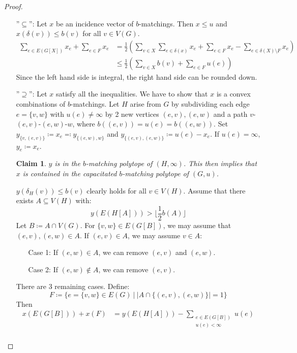 \documentclass[11pt, a4paper]{article}
\newcommand{\floor}[1]{\lfloor #1 \rfloor}
\newcommand{\abs}[1]{\left\lvert#1\right\rvert}
\newcommand{\set}[1]{\{#1\}}
\newtheorem*{claim}{Claim}
\theoremstyle{remark}
\theoremstyle{definition}
\begin{document}
\begin{proof}\
	\begin{enumerate}
		\item[''$\subseteq$'':]
		Let $x$ be an incidence vector of $b$-matchings. Then $x\leq u$ and
		$x(\delta(v))\leq b(v)$ for all $v\in V(G)$.
		\begin{align*}
			\sum_{e\in E(G[X])}x_e+\sum_{e\in F}x_e & =\frac{1}{2}\left(\sum_{v\in X}\sum_{e\in \delta(x)}x_e+\sum_{e\in F}x_e-\sum_{e\in\delta(X)\setminus F}x_e\right) \\
			                                        & \leq \frac{1}{2}\left(\sum_{v\in X}b(v)+\sum_{e\in F}u(e)\right)
		\end{align*}
		Since the left hand side is integral, the right hand side can be rounded down.

		\item[''$\supseteq$'':]
		Let $x$ satisfy all the inequalities. We have to show that $x$ is a convex
		combinations of $b$-matchings. Let $H$ arise from $G$ by subdividing
		each edge $e=\set{v,w}$ with $u(e)\neq\infty$ by 2 new vertices
		$(e,v), (e,w)$ and a path $v$-$(e,v)$-$(e,w)$-$w$, where
		$b((e,v))=u(e)=b((e,w))$. Set $y_{\set{v,(e,v)}}\coloneqq x_e\eqqcolon
			y_{\set{(e,w),w}}$ and $y_{\set{(e,v),(e,w)}}\coloneqq u(e)-x_e$. If
		$u(e)=\infty$, $y_e\coloneqq x_e$.
		\begin{claim}
			$y$ is in the $b$-matching polytope of $(H,\infty)$. This then implies
			that $x$ is contained in the capacitated $b$-matching polytope of $(G,u)$.
		\end{claim}
		$y(\delta_H(v))\leq b(v)$ clearly holds for all $v\in V(H)$. Assume
		that there exists $A\subseteq V(H)$ with:
		\[y(E(H[A]))>\floor{\frac{1}{2}b(A)}\]
		Let $B\coloneqq A\cap V(G)$. For $\set{v,w}\in E(G[B])$, we may
		assume that $(e,v),(e,w)\in A$. If $(e,v)\in A$, we may assume $v\in
			A$:
		\begin{enumerate}
			\item[Case 1:] If $(e,w)\in A$, we can remove $(e,v)$ and $(e,w)$.
			\item[Case 2:] If $(e,w)\notin A$, we can remove $(e,v)$.
		\end{enumerate}
		There are 3 remaining cases. Define:
		\[F\coloneqq \set{e=\set{v,w}\in E(G) \ |\ \abs{A\cap \set{(e,v),(e,w)}}=1}\]
		Then
		\begin{align*}
			x(E(G[B]))+x(F) & =y(E(H[A]))-\sum_{\substack{e\in E(G[B])               \\ u(e)<\infty}}u(e) \\

\end{align*}
\end{enumerate}
\end{proof}
\end{document}
